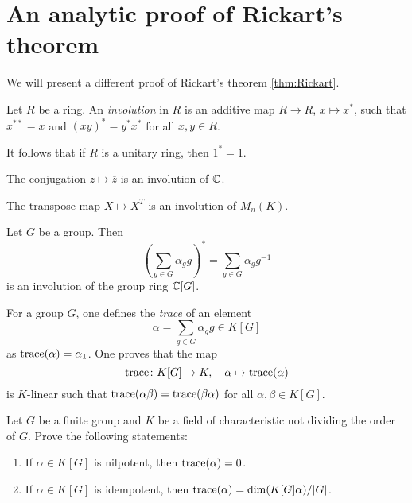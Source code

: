 \section{An analytic proof of Rickart's theorem}
\label{section:Rickart} 

We will present a different proof 
of Rickart's theorem \ref{thm:Rickart}. 

\begin{definition}
	Let $R$ be a ring. An \emph{involution} 
    in $R$ is an additive map  
    $R\to R$, $x\mapsto x^*$, such that $x^{**}=x$ and  $(xy)^*=y^*x^*$ for all 
	$x,y\in R$.
\end{definition}

It follows that if $R$ is a unitary ring, then 
$1^*=1$.

\begin{example}
	The conjugation $z\mapsto\overline{z}$ is an 
    involution of $\mathbb{C}$.
\end{example}

\begin{example}
	The transpose map $X\mapsto X^T$ is an involution of $M_n(K)$.
\end{example}

\begin{example}
	Let $G$ be a group. 
    Then \[
    \left(\sum_{g\in G}\alpha_gg\right)^*=\sum_{g\in G}\overline{\alpha_g}g^{-1}
    \]
	is an involution of the group ring $\mathbb{C}[G]$.
\end{example}

For a group $G$, one defines the \emph{trace} 
of an element 
\[
\alpha=\sum_{g\in G}\alpha_gg\in K[G]
\]
as $\operatorname{trace}(\alpha)=\alpha_1$. One proves that 
the map 
\[
\operatorname{trace}\colon K[G]\to K,\quad 
\alpha\mapsto\operatorname{trace}(\alpha)
\]
is $K$-linear such that   
$\operatorname{trace}(\alpha\beta)=\operatorname{trace}(\beta\alpha)$ for 
all $\alpha,\beta\in K[G]$. 

\begin{exercise}
	Let $G$ be a finite group and $K$ 
 be a field of characteristic not dividing the 
 order of $G$.
	Prove the following statements: 
	\begin{enumerate}
		\item If $\alpha\in K[G]$ is nilpotent, then $\operatorname{trace}(\alpha)=0$.
		\item If $\alpha\in K[G]$ is idempotent, then $\operatorname{trace}(\alpha)=\dim
			(K[G]\alpha)/|G|$.
	\end{enumerate}
\end{exercise}

